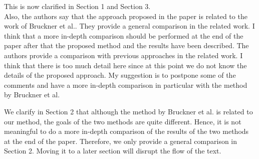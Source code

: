 \documentclass[10pt]{article}
\begin{document}
   {\color{blue}This is now clarified in Section 1 and Section 3.}\\

   Also, the authors say that the approach proposed in the paper is related
   to the work of Bruckner et al.. They provide a general comparison in the
   related work. I think that a more in-depth comparison should be performed
   at the end of the paper after that the proposed method and the results
   have been described.
   The authors provide a comparison with previous approaches in the related
   work. I think that there is too much detail here since at this point we
   do not know the details of the proposed approach. My suggestion is to
   postpone some of the comments and have a more in-depth comparison in
   particular with the method by Bruckner et al.

   {\color{blue}We clarify in Section 2 that although the method by Bruckner et al.
	   is related to our method, the goals of the two methods are quite different.
	   Hence, it is not meaningful to do a more in-depth comparison of the results
	   of the two methods at the end of the paper. Therefore, we only provide
	   a general comparison in Section 2. Moving it to a later section will
   disrupt the flow of the text.}
\end{document}
